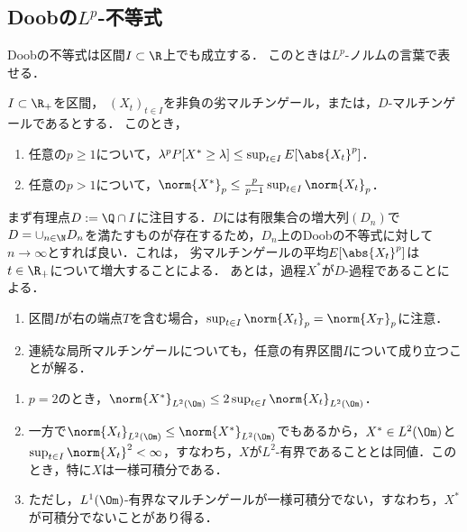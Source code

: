 \documentclass[uplatex,dvipdfmx]{jsreport}
\begin{document}
\subsection{Doobの$L^p$-不等式}

\begin{tcolorbox}[colframe=ForestGreen, colback=ForestGreen!10!white,breakable,colbacktitle=ForestGreen!40!white,coltitle=black,fonttitle=\bfseries\sffamily,
title=]
    Doobの不等式は区間$I\subset\R$上でも成立する．
    このときは$L^p$-ノルムの言葉で表せる．
\end{tcolorbox}

\begin{theorem}[Doob]
    $I\subset\R_+$を区間，
    $(X_t)_{t\in I}$を非負の劣マルチンゲール，または，$D$-マルチンゲールであるとする．
    このとき，
    \begin{enumerate}
        \item 任意の$p\ge1$について，$\lambda^pP[X^*\ge\lambda]\le\sup_{t\in I}E[\abs{X_t}^p]$．
        \item 任意の$p>1$について，$\norm{X^*}_p\le\frac{p}{p-1}\sup_{t\in I}\norm{X_t}_{p}$．
    \end{enumerate}
\end{theorem}
\begin{Proof}
    まず有理点$D:=\Q\cap I$に注目する．$D$には有限集合の増大列$(D_n)$で$D=\cup_{n\in\N}D_n$を満たすものが存在するため，$D_n$上のDoobの不等式に対して$n\to\infty$とすれば良い．これは，
    劣マルチンゲールの平均$E[\abs{X_t}^p]$は$t\in\R_+$について増大することによる．
    あとは，過程$X^*$が$D$-過程であることによる．
\end{Proof}
\begin{remarks}\mbox{}
    \begin{enumerate}
        \item 区間$I$が右の端点$T$を含む場合，$\sup_{t\in I}\norm{X_t}_p=\norm{X_T}_p$に注意．
        \item 連続な局所マルチンゲールについても，任意の有界区間$I$について成り立つことが解る．
    \end{enumerate}
\end{remarks}

\begin{corollary}\mbox{}
    \begin{enumerate}
        \item $p=2$のとき，$\norm{X^*}_{L^2(\Om)}\le 2\sup_{t\in I}\norm{X_t}_{L^2(\Om)}$．
        \item 一方で$\norm{X_t}_{L^2(\Om)}\le\norm{X^*}_{L^2(\Om)}$でもあるから，$X^*\in L^2(\Om)$と$\sup_{t\in I}\norm{X_t}^2<\infty$，すなわち，$X$が$L^2$-有界であることとは同値．このとき，特に$X$は一様可積分である．
        \item ただし，$L^1(\Om)$-有界なマルチンゲールが一様可積分でない，すなわち，$X^*$が可積分でないことがあり得る．
    \end{enumerate}
\end{corollary}
\end{document}

